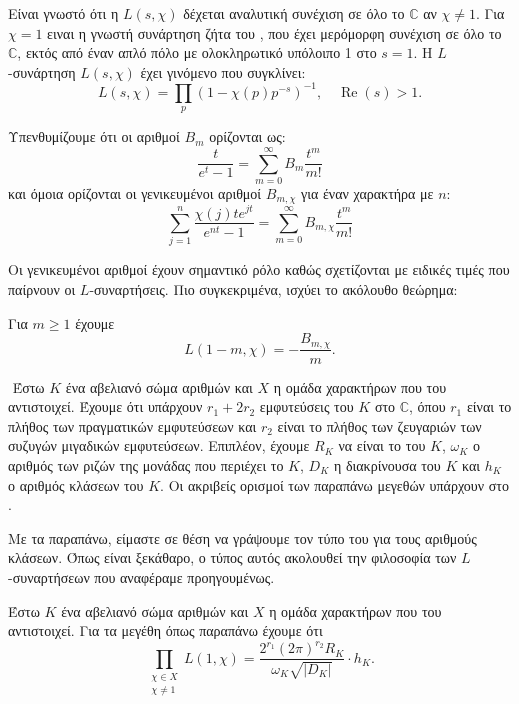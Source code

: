 \noindent Είναι γνωστό ότι η $L(s,\chi)$ δέχεται αναλυτική συνέχιση σε όλο το $\mathbb{C}$ αν $\chi\neq 1$. Για $\chi = 1$ ειναι η γνωστή 
συνάρτηση ζήτα του , που έχει μερόμορφη συνέχιση σε όλο το $\mathbb{C}$, εκτός από έναν απλό πόλο με ολοκληρωτικό υπόλοιπο 1 στο $s=1$. 
Η $L$-συνάρτηση $L(s,\chi)$ έχει γινόμενο  που συγκλίνει:
$$L(s,\chi) = \prod\limits_{p} (1-\chi(p)p^{-s})^{-1},\quad \operatorname{Re}(s)>1.$$

\noindent Υπενθυμίζουμε ότι οι αριθμοί  $B_m$ ορίζονται ως:
$$\frac{t}{e^t-1} = \sum\limits_{m=0}^\infty B_m \frac{t^m}{m!}$$ και όμοια ορίζονται οι γενικευμένοι αριθμοί  $B_{m,\chi}$ 
για έναν χαρακτήρα με  $n$:
$$\sum\limits_{j=1}^n \frac{\chi(j) t e^{jt}}{e^{nt}-1} = \sum\limits_{m=0}^\infty B_{m,\chi} \frac{t^m}{m!}$$

\noindent Οι γενικευμένοι αριθμοί  έχουν σημαντικό ρόλο καθώς σχετίζονται με ειδικές τιμές που παίρνουν οι $L$-συναρτήσεις. 
Πιο συγκεκριμένα, ισχύει το ακόλουθο θεώρημα:

\begin{theorem} \label{wash4.2}
	Για $m\geq 1$ έχουμε
	$$L(1-m,\chi) = - \frac{B_{m,\chi}}{m}.$$
\end{theorem}

$ $\newline
Έστω $K$ ένα αβελιανό σώμα αριθμών και $X$ η ομάδα χαρακτήρων που του αντιστοιχεί. Έχουμε ότι υπάρχουν $r_1 + 2r_2$ εμφυτεύσεις του $K$ στο 
$\mathbb{C}$, όπου $r_1$ είναι το πλήθος των πραγματικών εμφυτεύσεων και $r_2$ είναι το πλήθος των ζευγαριών των συζυγών μιγαδικών 
εμφυτεύσεων. Επιπλέον, έχουμε $R_K$ να είναι το  του $K$, $\omega_K$ ο αριθμός των ριζών της μονάδας που περιέχει το $K$, $D_K$ 
η διακρίνουσα του $K$ και $h_K$ ο αριθμός κλάσεων του $K$. Οι ακριβείς ορισμοί των παραπάνω μεγεθών υπάρχουν στο \cite{Milne1}.

Με τα παραπάνω, είμαστε σε θέση να γράψουμε τον τύπο του  για τους αριθμούς κλάσεων. Όπως είναι ξεκάθαρο, ο τύπος αυτός ακολουθεί την φιλοσοφία 
των $L$-συναρτήσεων που αναφέραμε προηγουμένως.

\begin{theorem}
	Έστω $K$ ένα αβελιανό σώμα αριθμών και $X$ η ομάδα χαρακτήρων που του αντιστοιχεί. Για τα μεγέθη όπως παραπάνω έχουμε ότι
	$$\prod\limits_{\substack{\chi \in X \\ \chi \neq 1} } L(1,\chi) = \frac{2^{r_1} (2\pi)^{r_2} R_K}{\omega_K \sqrt{|D_K|}} \cdot h_K.$$
\end{theorem}

